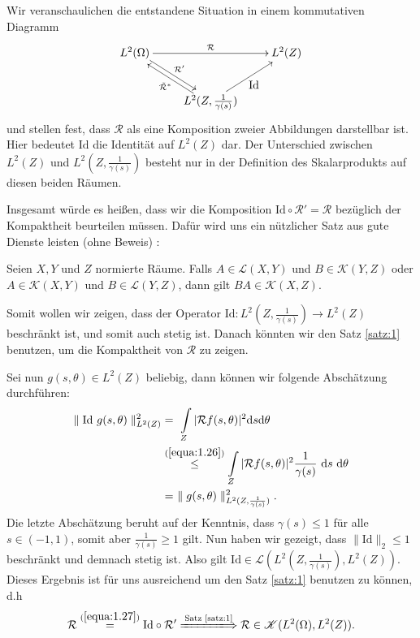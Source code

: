 Wir veranschaulichen die entstandene Situation in einem kommutativen Diagramm  
\begin{equation}
	\begin{xy}
	\xymatrix{
		L^2(\Omega) \ar[rr]^{\mathcal{R}} \ar@<2pt>[rd]^{\mathcal{R}'} &  & L^2(Z)\\
		&  L^2(Z, \frac{1}{\gamma(s)}) \ar@<2pt>[lu]^{\tilde{\mathcal{R}}^*} \ar[ru]_{\mbox{Id}}&
		}
	\end{xy}
	\label{equa:1.27}
\end{equation}
und stellen fest, dass $\mathcal{R}$ als eine Komposition zweier Abbildungen darstellbar ist. Hier bedeutet $\mbox{Id}$ die Identität auf $L^2(Z)$ dar. Der Unterschied zwischen $L^2(Z)$ und $L^2(Z,\frac{1}{\gamma(s)})$ besteht nur in der Definition des Skalarprodukts auf diesen beiden Räumen.

Insgesamt würde es heißen, dass wir die Komposition $\mbox{Id}\circ\mathcal{R}' = \mathcal{R}$ bezüglich der Kompaktheit beurteilen müssen. Dafür wird uns ein nützlicher Satz aus \cite[S. 27]{Rieder03} gute Dienste leisten (ohne Beweis) :
\begin{theorem}
	Seien $X, Y$ und $Z$ normierte Räume. Falls $A \in \mathscr{L}(X,Y)$ und $B \in \mathscr{K}(Y,Z)$ oder $A \in \mathscr{K}(X,Y)$ und $B \in \mathscr{L}(Y,Z)$, dann gilt $BA \in \mathscr{K}(X,Z)$.
	\label{satz:1}
\end{theorem}
Somit wollen wir zeigen, dass der Operator $\mbox{Id}:L^2(Z, \frac{1}{\gamma(s)}) \rightarrow L^2(Z)$ beschränkt ist, und somit auch stetig ist. Danach könnten wir den Satz \ref{satz:1} benutzen, um die Kompaktheit von $\mathcal{R}$ zu zeigen.

Sei nun $g(s,\theta) \in L^2(Z)$ beliebig, dann können wir folgende Abschätzung durchführen:
\begin{equation}
	\begin{split}
		\parallel \mbox{Id} \ g(s, \theta) \parallel_{L^2(Z)}^{2} & = \ \int \limits_{Z} |\mathcal{R}f(s, \theta)|^2 \mbox{d}s \mbox{d}\theta \\
		& \stackrel{(\ref{equa:1.26})}{\leq} \int \limits_{Z}  |\mathcal{R}f(s, \theta)|^2 \frac{1}{\gamma(s)} \ \mbox{d}s \ \mbox{d}\theta\\
		& = \ \parallel g(s, \theta) \parallel_{L^2(Z, \frac{1}{\gamma(s)})}^{2}.
	\end{split}
	\label{equa:1.28}
\end{equation}
Die letzte Abschätzung beruht auf der Kenntnis, dass  $\gamma(s) \leq 1$ für alle $s \in (-1,1)$, somit aber $\frac{1}{\gamma(s)} \geq 1$ gilt. Nun haben wir gezeigt, dass $\parallel \mbox{Id} \parallel_2 \leq 1$ beschränkt und demnach stetig ist. Also gilt $\mbox{Id} \in \mathscr{L}(L^2(Z, \frac{1}{\gamma(s)}), L^2(Z))$. Dieses Ergebnis ist für uns ausreichend um den Satz \ref{satz:1} benutzen zu können, d.h 
\begin{equation}
	\mathcal{R} \stackrel{(\ref{equa:1.27})}{=} \mbox{Id} \circ \mathcal{R}' \xLongrightarrow{\text{Satz \ref{satz:1}}} \mathcal{R} \in \mathscr{K}(L^2(\Omega), L^2(Z)).
	\label{equa:1.29}
\end{equation}


